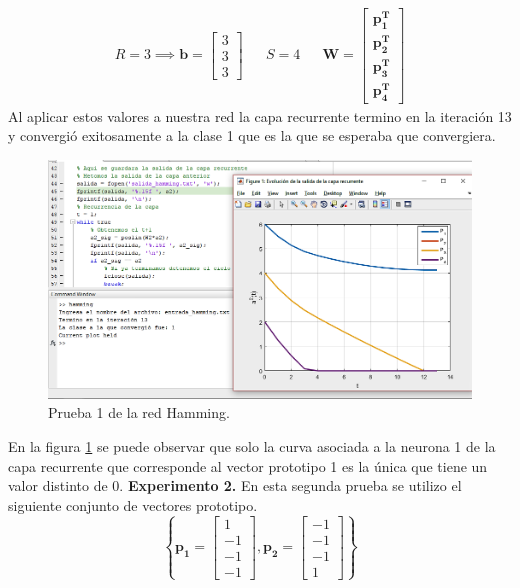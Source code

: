 \begin{align*}
R = 3 \implies \boldsymbol{b} = \left[\begin{array}{c}3\\ 3\\ 3\end{array}\right] && S = 4 && \boldsymbol{W} = \left[\begin{array}{c}\boldsymbol{p^{T}_1}\\ \boldsymbol{p^{T}_2}\\ \boldsymbol{p^{T}_3} \\ \boldsymbol{p^{T}_4}\end{array}\right]
\end{align*}
Al aplicar estos valores a nuestra red la capa recurrente termino en la iteración 13 y convergió exitosamente a la clase 1 que es la que se esperaba que convergiera.
\begin{figure}[H]
    \begin{center}
        \includegraphics[width=16cm]{img/hamming/hamming1.png}
        \caption{Prueba 1 de la red Hamming.}
        \label{fig:hamming1}
    \end{center}
\end{figure}
En la figura \ref{fig:hamming1} se puede observar que solo la curva asociada a la neurona 1 de la capa recurrente que corresponde al vector prototipo 1 es la única que tiene un valor distinto de 0.
\newline
\textbf{Experimento 2.}
En esta segunda prueba se utilizo el siguiente conjunto de vectores prototipo.
\[ \left\lbrace \boldsymbol{p_1} = \left[\begin{array}{c}1\\ -1\\ -1 \\ -1 \end{array}\right], \boldsymbol{p_2} = \left[\begin{array}{c}-1\\ -1\\ -1 \\ 1 \end{array}\right] \right\rbrace \]
